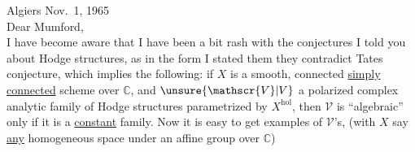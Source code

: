 Algiers Nov.~1, 1965\\
Dear Mumford,\\

I have become aware that I have been a bit rash with the conjectures I told you about Hodge structures, as in the form I stated them they contradict Tates conjecture, which implies the following: if $X$ is a smooth, connected \uline{simply connected} scheme over $\mathbb{C}$, and $\unsure{\mathscr{V}|V}$ a polarized complex analytic family of Hodge structures parametrized by $X^{\mathrm{hol}}$, then $\mathscr{V}$ is ``algebraic'' only if it is a \uline{constant} family. Now it is easy to get examples of $\mathscr{V}$'s, (with $X$ say \uline{any} homogeneous space under an affine group over $\mathbb{C}$)
